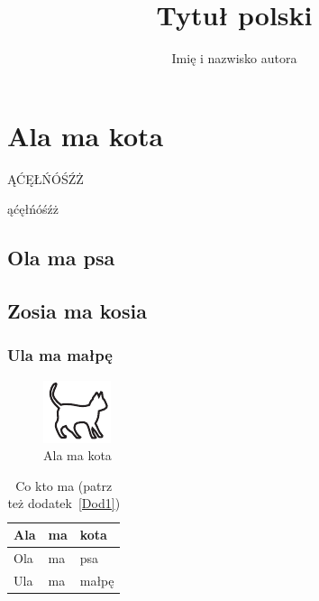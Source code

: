 \documentclass[magister,druk,polski]{dyplom}
\author{Imię i nazwisko autora}
\title{Tytuł  polski}
\begin{document}
\maketitle

\tableofcontents
\listoffigures
\listoftables


\chapter{Ala ma kota}

ĄĆĘŁŃÓŚŹŻ

ąćęłńóśźż

\lipsum[1]

\section{Ola ma psa}

\lipsum[2-3]

\section{Zosia ma kosia}

\lipsum[7]

\subsection{Ula ma małpę}

\lipsum[4-10]

\begin{figure}
\includegraphics[width=.4\textwidth]{kotek}
\caption{Ala ma kota}
\end{figure}

\lipsum[11-15]

\begin{table}
\caption{Co kto ma \cite{harel_rzecz_2008} (patrz też dodatek~\ref{Dod1})}
\begin{tabular}{|l|l|l|}
\hline
Ala & ma & kota \\
\hline
Ola & ma & psa \\
\hline
Ula & ma & małpę\\
\hline
\end{tabular}
\end{table}
\end{document}
